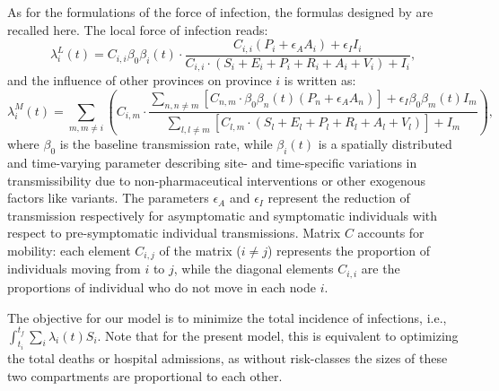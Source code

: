 As for the formulations of the force of infection, the formulas designed by \textcite{Gatto:SpreadDynamicsCOVID19:2020,Bertuzzo:GeographyCOVID19Spread:2020}are recalled here. The local force of infection reads:
\begin{equation} 
     \lambda^L_i(t) = C_{i,i} \beta_{0}  \beta_i(t) \cdot \frac{C_{i,i}  (P_i + \epsilon_A  A_i) + \epsilon_I  I_i}{C_{i,i} \cdot (S_i + E_i + P_i + R_i + A_i + V_i) + I_i}, \label{eq:foiL}
\end{equation}
and the influence of other provinces on province $i$ is written as:
\begin{equation}
     \lambda^M_i(t) = \sum_{m, m \neq i} \left( 
     C_{i,m} \cdot 
     \frac{
     \sum_{n, n \neq m} \left[ C_{n,m} \cdot \beta_{0}  \beta_n(t)  (P_n + \epsilon_A  A_n) \right] + \epsilon_I  \beta_{0}  \beta_m(t)  I_m
     }
     {
     \sum_{l, l \neq m}  \left[C_{l, m} \cdot (S_l + E_l + P_l + R_l + A_l + V_l) \right] + I_m
     } 
     \right), \label{eq:foiM}
\end{equation}
where $\beta_{0}$ is the baseline transmission rate, while $\beta_{i}(t)$ is a spatially distributed and time-varying parameter describing site- and time-specific variations in transmissibility due to non-pharmaceutical interventions or other exogenous factors like variants. The parameters $\epsilon_A$ and $\epsilon_I$ represent the reduction of transmission respectively for asymptomatic and symptomatic individuals with respect to pre-symptomatic individual transmissions. Matrix $C$ accounts for mobility: each element $C_{i,j}$ of the matrix ($i \neq j$) represents the proportion of individuals moving from $i$ to $j$, while the diagonal elements $C_{i,i}$ are the proportions of individual who do not move in each node $i$.

The objective for our model is to minimize the total incidence of infections, i.e., $\int_{t_i}^{t_f} \sum_i \lambda_i(t) S_i$. Note that for the present model, this is equivalent to optimizing the total deaths or hospital admissions, as without risk-classes the sizes of these two compartments are proportional to each other.


